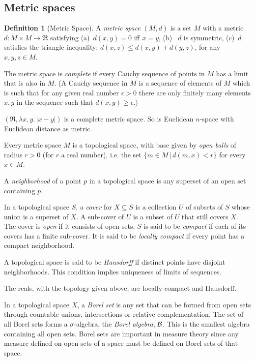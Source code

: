 \documentclass{article}
\newcommand{\alt}{\,|\,}
\theoremstyle{definition}
\newtheorem{definition}{Definition}[section]
\begin{document}
\subsection{Metric spaces}

\begin{definition}[Metric Space] A {\em metric space} \((M,d)\) is a set \(M\) with a metric \(d:M \times M \rightarrow \Re\) satisfying (a)~\(d(x,y)=0\) iff \(x=y\), (b)~ \(d\) is symmetric, (c)~\(d\) satisfies the triangle inequality: \(d(x,z) \leq d(x,y)+d(y,z)\), for any \(x,y,z\in M\).

  The metric space is {\em complete} if every Cauchy sequence of points in \(M\) has a limit that is also in \(M\). (A Cauchy sequence in \(M\) is a sequence of elements of \(M\) which is such that for any given real number \(\epsilon > 0\) there are only finitely many elements \(x,y\) in the sequence such that \(d(x,y) \geq \epsilon\).)
\end{definition}

\((\Re, \lambda x,y.\, |x-y|)\) is a complete metric space. So is Euclidean \(n\)-space with Euclidean distance as metric.

Every metric space \(M\) is a topological space, with base given by {\em open balls} of radius \(r > 0\) (for \(r\) a real number), i.e. the set \(\{m \in M \alt d(m,x) < r\}\) for every \(x\in M\).

A {\em neighborhood} of a point \(p\) in a topological space is any superset of an open set containing \(p\).

In a topological space \(S\), a {\em cover} for \(X \subseteq S\) is a collection \(U\) of subsets of \(S\) whose union is a superset of \(X\). A sub-cover of \(U\) is a subset of \(U\) that still covers \(X\). The cover is {\em open} if it consists of open sets.  \(S\) is said to be {\em compact} if each of its covers has a finite sub-cover. It is said to be {\em locally compact} if every point has a compact neighborhood.

A topological space is said to be {\em Hausdorff} if distinct points have disjoint neighborhoods. This condition implies uniqueness of limits of sequences.

The reals, with the topology given above, are locally compact and Hausdorff.

In a topological space \(X\), a {\em Borel set} is any set that can be formed from open sets through countable unions, intersections or relative complementation. The set of all Borel sets forms a \(\sigma\)-algebra, the {\em Borel algebra}, \({\cal B}\). This is the smallest algebra containing all open sets. Borel sets are important in measure theory since any measure defined on open sets of a space must be defined on Borel sets of that space.
\end{document}
